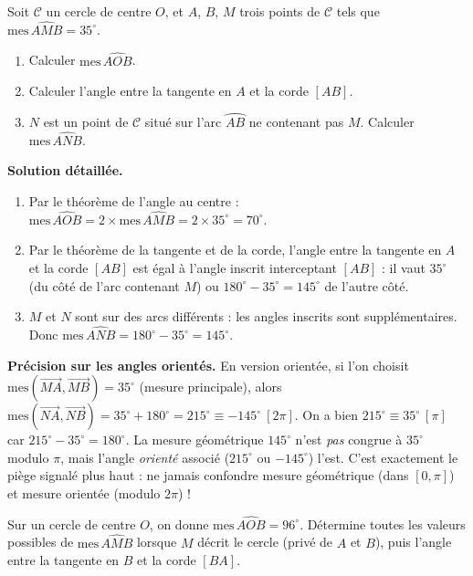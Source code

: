 \documentclass[11pt]{article}
\begin{document}
\begin{exoresolu}
Soit $\mathcal{C}$ un cercle de centre $O$, et $A$, $B$, $M$ trois points de $\mathcal{C}$ tels que $\text{mes}\,\widehat{AMB} = 35^\circ$.
\begin{enumerate}
\item Calculer $\text{mes}\,\widehat{AOB}$.
\item Calculer l'angle entre la tangente en $A$ et la corde $[AB]$.
\item $N$ est un point de $\mathcal{C}$ situé sur l'arc $\wideparen{AB}$ ne contenant pas $M$. Calculer $\text{mes}\,\widehat{ANB}$.
\end{enumerate}
\tcblower
\textbf{Solution détaillée.}
\begin{enumerate}
\item Par le théorème de l'angle au centre : $\text{mes}\,\widehat{AOB} = 2 \times \text{mes}\,\widehat{AMB} = 2 \times 35^\circ = 70^\circ$.
\item Par le théorème de la tangente et de la corde, l'angle entre la tangente en $A$ et la corde $[AB]$ est égal à l'angle inscrit interceptant $[AB]$ : il vaut $35^\circ$ (du côté de l'arc contenant $M$) ou $180^\circ - 35^\circ = 145^\circ$ de l'autre côté.
\item $M$ et $N$ sont sur des arcs différents : les angles inscrits sont supplémentaires. Donc $\text{mes}\,\widehat{ANB} = 180^\circ - 35^\circ = 145^\circ$. 
\end{enumerate}
\textbf{Précision sur les angles orientés.} En version orientée, si l'on choisit $\text{mes}(\overrightarrow{MA}, \overrightarrow{MB}) = 35^\circ$ (mesure principale), alors $\text{mes}(\overrightarrow{NA}, \overrightarrow{NB}) = 35^\circ + 180^\circ = 215^\circ \equiv -145^\circ \ [2\pi]$. On a bien $215^\circ \equiv 35^\circ \ [\pi]$ car $215^\circ - 35^\circ = 180^\circ$. La mesure géométrique $145^\circ$ n'est \emph{pas} congrue à $35^\circ$ modulo $\pi$, mais l'angle \emph{orienté} associé ($215^\circ$ ou $-145^\circ$) l'est. C'est exactement le piège signalé plus haut : ne jamais confondre mesure géométrique (dans $[0,\pi]$) et mesure orientée (modulo $2\pi$) !
\end{exoresolu}

\begin{exercice}[Exercice 1]
Sur un cercle de centre $O$, on donne $\text{mes}\,\widehat{AOB} = 96^\circ$. Détermine toutes les valeurs possibles de $\text{mes}\,\widehat{AMB}$ lorsque $M$ décrit le cercle (privé de $A$ et $B$), puis l'angle entre la tangente en $B$ et la corde $[BA]$.
\end{exercice}
\end{document}
